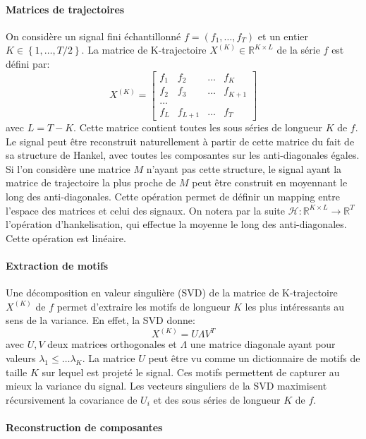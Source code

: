 \documentclass{gretsi}
\def\HH{\mathcal H}
\newcommand{\R}{\mathbb R}
\newcommand{\val}[3]{(#1_1 #3 \dots #3 #1_#2)}
\begin{document}
\paragraph{Matrices de trajectoires}

On considère un signal fini échantillonné $f = \val{f}{T}{,}$ et un entier $K \in \left \{ 1, \dots, T/2 \right \}$. La matrice de K-trajectoire $X^{(K)} \in \R^{K\times L}$ de la série $f$ est défini par:
$$ X^{(K)} = \begin{bmatrix}
	f_1 & f_2 &\dots & f_K\\
	f_2 & f_3 &\dots & f_{K+1}\\
	\dots\\
	f_{L} & f_{L+1} &\dots & f_T
\end{bmatrix}$$ avec $L = T-K$. Cette matrice contient toutes les sous séries de longueur $K$ de $f$.\\

Le signal peut être reconstruit naturellement à partir de cette matrice du fait de sa structure de Hankel, avec toutes les composantes sur les anti-diagonales égales. Si l'on considère une matrice $M$ n'ayant pas cette structure, le signal ayant la matrice de trajectoire la plus proche de $M$ peut être construit en moyennant le long des anti-diagonales. Cette opération permet de définir un mapping entre l'espace des matrices et celui des signaux. On notera par la suite $\HH: \R^{K\times L} \to \R^T$ l'opération d'hankelisation, qui effectue la moyenne le long des anti-diagonales. Cette opération est linéaire.

\paragraph{Extraction de motifs}

Une décomposition en valeur singulière (SVD) de la matrice de K-trajectoire $X^{(K)}$ de $f$ permet d'extraire les motifs de longueur $K$ les plus intéressants au sens de la variance. En effet, la SVD donne: 
$$
X^{(K)} = U \Lambda V^T
$$ avec $U, V$ deux matrices orthogonales et $\Lambda$ une matrice diagonale ayant pour valeurs $\lambda_1\le \dots \lambda_K$. La matrice $U$ peut être vu comme un dictionnaire de motifs de taille $K$ sur lequel est projeté le signal. Ces motifs permettent de capturer au mieux la variance du signal. Les vecteurs singuliers de la SVD maximisent récursivement la covariance de $U_i$ et des sous séries de longueur $K$ de $f$.

\paragraph{Reconstruction de composantes}
\end{document}
